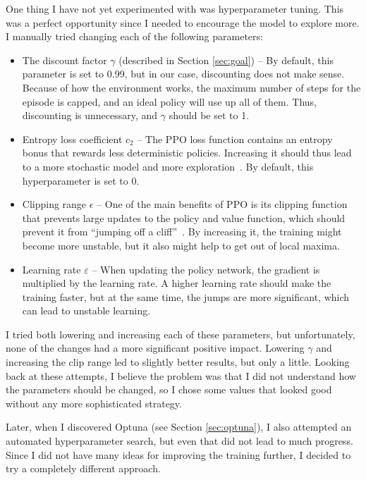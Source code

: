 \documentclass[
  digital,     %
  oneside,     %
  nosansbold,  %
  nocolorbold, %
  lof,         %
  lot,         %
]{fithesis4}
\begin{document}
One thing I have not yet experimented with was hyperparameter tuning. This was a perfect opportunity since I needed to encourage the model to explore more. I manually tried changing each of the following parameters:

\begin{itemize}
    \item The discount factor $\gamma$ (described in Section \ref{sec:goal}) -- By default, this parameter is set to 0.99, but in our case, discounting does not make sense. Because of how the environment works, the maximum number of steps for the episode is capped, and an ideal policy will use up all of them. Thus, discounting is unnecessary, and $\gamma$ should be set to 1.
    \item Entropy loss coefficient $c_2$ -- The PPO loss function contains an entropy bonus that rewards less deterministic policies. Increasing it should thus lead to a more stochastic model and more exploration~\cite{PPO_paper}. By default, this hyperparameter is set to 0.
    \item Clipping range $\epsilon$ -- One of the main benefits of PPO is its clipping function that prevents large updates to the policy and value function, which should prevent it from \enquote{jumping off a cliff}~\cite{PPO_paper}. By increasing it, the training might become more unstable, but it also might help to get out of local maxima.
    \item Learning rate $\varepsilon$ -- When updating the policy network, the gradient is multiplied by the learning rate. A higher learning rate should make the training faster, but at the same time, the jumps are more significant, which can lead to unstable learning.
\end{itemize}

I tried both lowering and increasing each of these parameters, but unfortunately, none of the changes had a more significant positive impact. Lowering $\gamma$ and increasing the clip range led to slightly better results, but only a little. Looking back at these attempts, I believe the problem was that I did not understand how the parameters should be changed, so I chose some values that looked good without any more sophisticated strategy.

Later, when I discovered Optuna (see Section \ref{sec:optuna}), I also attempted an automated hyperparameter search, but even that did not lead to much progress. Since I did not have many ideas for improving the training further, I decided to try a completely different approach.
\end{document}
